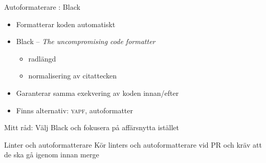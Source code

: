\begin{frame}{Autoformaterare : Black}
  \begin{itemize}
    \item Formatterar koden automatiskt
    \item Black -- \textit{The uncompromising code formatter}
      \begin{itemize}
        \item radlängd
        \item normalisering av citattecken
      \end{itemize}
    \item Garanterar samma exekvering av koden innan/efter
    \item Finns alternativ: \textsc{yapf}, autoformatter
  \end{itemize}

  Mitt råd: Välj Black och fokusera på affärsnytta istället
\end{frame}

\begin{frame}[standout]{Linter och autoformatterare}
  Kör linters och autoformatterare vid PR och kräv att de ska gå igenom innan merge
\end{frame}

